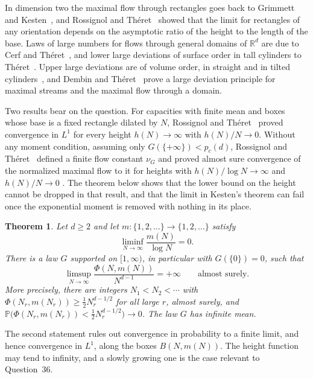 \documentclass[11pt]{amsart}
\newtheorem{theorem}{Theorem}[section]
\theoremstyle{definition}
\theoremstyle{remark}
\renewcommand{\P}{\mathbb{P}}
\begin{document}
In dimension two the maximal flow through rectangles goes back to Grimmett and Kesten~\cite{GK84}, and Rossignol and Th\'eret~\cite{RT10b} showed that the limit for rectangles of any orientation depends on the asymptotic ratio of the height to the length of the base. Laws of large numbers for flows through general domains of $\mathbb{R}^d$ are due to Cerf and Th\'eret~\cite{CT11}, and lower large deviations of surface order in tall cylinders to Th\'eret~\cite{Th08}. Upper large deviations are of volume order, in straight and in tilted cylinders~\cite{Th07,Th14}, and Dembin and Th\'eret~\cite{DT21} prove a large deviation principle for maximal streams and the maximal flow through a domain.

Two results bear on the question. For capacities with finite mean and boxes whose base is a fixed rectangle dilated by $N$, Rossignol and Th\'eret~\cite{RT10} proved convergence in $L^1$ for every height $h(N)\to\infty$ with $h(N)/N\to0$. Without any moment condition, assuming only $G(\{+\infty\})<p_c(d)$, Rossignol and Th\'eret~\cite{RT18} defined a finite flow constant $\nu_G$ and proved almost sure convergence of the normalized maximal flow to it for heights with $h(N)/\log N\to\infty$ and $h(N)/N\to0$ \cite[Theorem~2.4]{RT18}. The theorem below shows that the lower bound on the height cannot be dropped in that result, and that the limit in Kesten's theorem can fail once the exponential moment is removed with nothing in its place.

\begin{theorem}\label{thm:main}
Let $d\ge2$ and let $m\colon\{1,2,\dots\}\to\{1,2,\dots\}$ satisfy
\begin{equation}\label{eq:thin}
\liminf_{N\to\infty}\frac{m(N)}{\log N}=0 .
\end{equation}
There is a law $G$ supported on $[1,\infty)$, in particular with $G(\{0\})=0$, such that
\[
\limsup_{N\to\infty}\frac{\Phi(N,m(N))}{N^{d-1}}=+\infty\qquad\text{almost surely.}
\]
More precisely, there are integers $N_1<N_2<\cdots$ with $\Phi(N_r,m(N_r))\ge\frac12N_r^{d-1/2}$ for all large $r$, almost surely, and $\P\bigl(\Phi(N_r,m(N_r))<\frac12N_r^{d-1/2}\bigr)\to0$. The law $G$ has infinite mean.
\end{theorem}

The second statement rules out convergence in probability to a finite limit, and hence convergence in $L^1$, along the boxes $B(N,m(N))$. The height function may tend to infinity, and a slowly growing one is the case relevant to Question~36.
\end{document}
